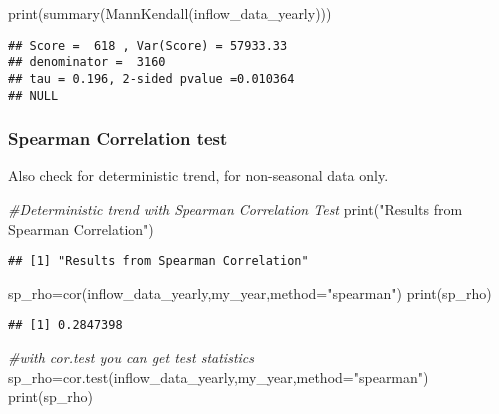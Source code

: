 \documentclass[
]{article}
\newenvironment{Shaded}{\begin{snugshade}}{\end{snugshade}}
\newcommand{\AttributeTok}[1]{\textcolor[rgb]{0.77,0.63,0.00}{#1}}
\newcommand{\CommentTok}[1]{\textcolor[rgb]{0.56,0.35,0.01}{\textit{#1}}}
\newcommand{\FunctionTok}[1]{\textcolor[rgb]{0.00,0.00,0.00}{#1}}
\newcommand{\NormalTok}[1]{#1}
\newcommand{\OtherTok}[1]{\textcolor[rgb]{0.56,0.35,0.01}{#1}}
\newcommand{\StringTok}[1]{\textcolor[rgb]{0.31,0.60,0.02}{#1}}
\begin{document}
\begin{Shaded}
\begin{Highlighting}[]
\FunctionTok{print}\NormalTok{(}\FunctionTok{summary}\NormalTok{(}\FunctionTok{MannKendall}\NormalTok{(inflow\_data\_yearly)))}
\end{Highlighting}
\end{Shaded}

\begin{verbatim}
## Score =  618 , Var(Score) = 57933.33
## denominator =  3160
## tau = 0.196, 2-sided pvalue =0.010364
## NULL
\end{verbatim}

\hypertarget{spearman-correlation-test}{%
\subsubsection{Spearman Correlation
test}\label{spearman-correlation-test}}

Also check for deterministic trend, for non-seasonal data only.

\begin{Shaded}
\begin{Highlighting}[]
\CommentTok{\#Deterministic trend with Spearman Correlation Test}
\FunctionTok{print}\NormalTok{(}\StringTok{"Results from Spearman Correlation"}\NormalTok{)}
\end{Highlighting}
\end{Shaded}

\begin{verbatim}
## [1] "Results from Spearman Correlation"
\end{verbatim}

\begin{Shaded}
\begin{Highlighting}[]
\NormalTok{sp\_rho}\OtherTok{=}\FunctionTok{cor}\NormalTok{(inflow\_data\_yearly,my\_year,}\AttributeTok{method=}\StringTok{"spearman"}\NormalTok{)}
\FunctionTok{print}\NormalTok{(sp\_rho)}
\end{Highlighting}
\end{Shaded}

\begin{verbatim}
## [1] 0.2847398
\end{verbatim}

\begin{Shaded}
\begin{Highlighting}[]
\CommentTok{\#with cor.test you can get test statistics}
\NormalTok{sp\_rho}\OtherTok{=}\FunctionTok{cor.test}\NormalTok{(inflow\_data\_yearly,my\_year,}\AttributeTok{method=}\StringTok{"spearman"}\NormalTok{)}
\FunctionTok{print}\NormalTok{(sp\_rho)}
\end{Highlighting}
\end{Shaded}
\end{document}
